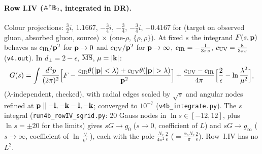 \paragraph{Row I.IV ($\mathbb{A}^\dagger\mathbb{B}_2$, integrated in DR).} Colour projections: $\frac32i$, $1.1667$, $-\frac34i$, $-\frac34$, $-\frac34i$, $-0.4167$ for (target on observed gluon, absorbed gluon, source) $\times$ (one-$\rho$, $\{\rho,\rho\}$). At fixed $s$ the integrand $F(s,\mathbf{p})$ behaves as $c_{\rm IR}/\mathbf{p}^2$ for $\mathbf{p}\to0$ and $c_{\rm UV}/\mathbf{p}^2$ for $\mathbf{p}\to\infty$, $c_{\rm IR}=-\frac{1}{3\pi s}$, $c_{\rm UV}=\frac{8}{3\pi s}$ (\texttt{v4.out}). In $d_\perp=2-\epsilon$, $\overline{\rm MS}$, $\mu=|\mathbf{k}|$:
\begin{align}
G(s)=\int\frac{d^2p}{(2\pi)^2}\Big[F-\frac{c_{\rm IR}\theta(|\v p|<\lambda)+c_{\rm UV}\theta(|\v p|>\lambda)}{\v p^2}\Big]+\frac{c_{\rm UV}-c_{\rm IR}}{4\pi}\Big[\frac2\epsilon-\ln\frac{\lambda^2}{\mu^2}\Big],
\end{align}
($\lambda$-independent, checked), with radial edges scaled by $\sqrt s$ and angular nodes refined at $\mathbf{p}\parallel-\mathbf{l},-\mathbf{k}-\mathbf{l},-\mathbf{k}$; converged to $10^{-7}$ (\texttt{v4b\_integrate.py}). The $s$ integral (\texttt{run4b\_rowIV\_sgrid.py}: 20 Gauss nodes in $\ln s\in[-12,12]$, plus $\ln s=\pm20$ for the limits) gives $sG\to g_0$ ($s\to0$, coefficient of $L$) and $sG\to g_\infty$ ($s\to\infty$, coefficient of $\ln\frac\vee{k^+}$), each with the pole $\frac{N_c}{4\pi^2}\frac2\epsilon$ ($=\frac{\alpha_sN_c}{\pi}\frac2\epsilon$). Row~I.IV has no $L^2$.

